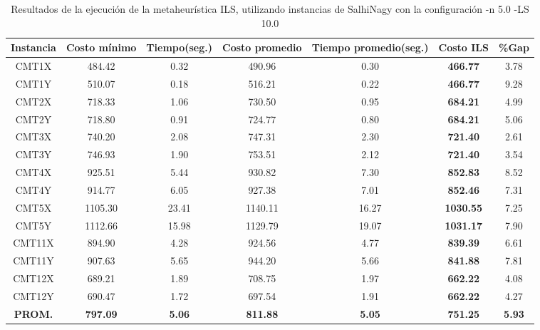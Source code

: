 \begin{table}[ht]
\caption{Resultados de la ejecución de la metaheurística ILS, utilizando instancias de SalhiNagy con la configuración -n 5.0 -LS 10.0}
\centering
\small
\begin{tabular}{c c c c c c c}
\hline\hline
Instancia & Costo mínimo & Tiempo(seg.) & Costo promedio & Tiempo promedio(seg.) & Costo ILS & \%Gap \\ [0.5ex]
\hline
CMT1X & 484.42 & 0.32 & 
490.96 & 0.30 & \bf{466.77} & 
3.78\\CMT1Y & 510.07 & 0.18 & 
516.21 & 0.22 & \bf{466.77} & 
9.28\\CMT2X & 718.33 & 1.06 & 
730.50 & 0.95 & \bf{684.21} & 
4.99\\CMT2Y & 718.80 & 0.91 & 
724.77 & 0.80 & \bf{684.21} & 
5.06\\CMT3X & 740.20 & 2.08 & 
747.31 & 2.30 & \bf{721.40} & 
2.61\\CMT3Y & 746.93 & 1.90 & 
753.51 & 2.12 & \bf{721.40} & 
3.54\\CMT4X & 925.51 & 5.44 & 
930.82 & 7.30 & \bf{852.83} & 
8.52\\CMT4Y & 914.77 & 6.05 & 
927.38 & 7.01 & \bf{852.46} & 
7.31\\CMT5X & 1105.30 & 23.41 & 
1140.11 & 16.27 & \bf{1030.55} & 
7.25\\CMT5Y & 1112.66 & 15.98 & 
1129.79 & 19.07 & \bf{1031.17} & 
7.90\\CMT11X & 894.90 & 4.28 & 
924.56 & 4.77 & \bf{839.39} & 
6.61\\CMT11Y & 907.63 & 5.65 & 
944.20 & 5.66 & \bf{841.88} & 
7.81\\CMT12X & 689.21 & 1.89 & 
708.75 & 1.97 & \bf{662.22} & 
4.08\\CMT12Y & 690.47 & 1.72 & 
697.54 & 1.91 & \bf{662.22} & 
4.27\\\bf{PROM.} & 
\bf{797.09} & \bf{5.06} & \bf{811.88} & \bf{5.05} & \bf{751.25} & \bf{5.93}\\[1ex]\hline
\end{tabular}
\label{table:nonlin}
\end{table} \clearpage

